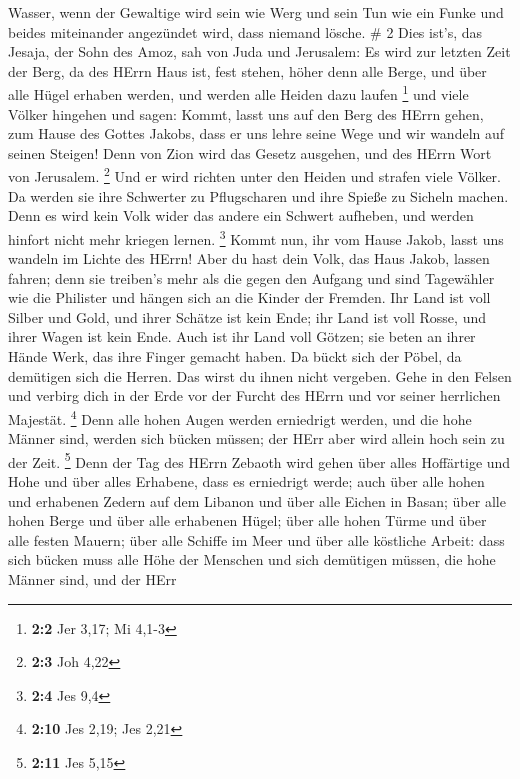 Wasser,  wenn der Gewaltige wird sein wie Werg und sein Tun
wie ein Funke und beides miteinander angezündet wird, dass niemand
lösche. \# 2  Dies ist's, das Jesaja, der Sohn des Amoz, sah
von Juda und Jerusalem:  Es wird zur letzten Zeit der Berg,
da des HErrn Haus ist, fest stehen, höher denn alle Berge, und über alle
Hügel erhaben werden, und werden alle Heiden dazu laufen \footnote{\textbf{2:2}
  Jer 3,17; Mi 4,1-3}  und viele Völker hingehen und sagen:
Kommt, lasst uns auf den Berg des HErrn gehen, zum Hause des Gottes
Jakobs, dass er uns lehre seine Wege und wir wandeln auf seinen Steigen!
Denn von Zion wird das Gesetz ausgehen, und des HErrn Wort von
Jerusalem. \footnote{\textbf{2:3} Joh 4,22}  Und er wird
richten unter den Heiden und strafen viele Völker. Da werden sie ihre
Schwerter zu Pflugscharen und ihre Spieße zu Sicheln machen. Denn es
wird kein Volk wider das andere ein Schwert aufheben, und werden hinfort
nicht mehr kriegen lernen. \footnote{\textbf{2:4} Jes 9,4} 
Kommt nun, ihr vom Hause Jakob, lasst uns wandeln im Lichte des HErrn!
 Aber du hast dein Volk, das Haus Jakob, lassen fahren; denn
sie treiben's mehr als die gegen den Aufgang und sind Tagewähler wie die
Philister und hängen sich an die Kinder der Fremden.  Ihr
Land ist voll Silber und Gold, und ihrer Schätze ist kein Ende; ihr Land
ist voll Rosse, und ihrer Wagen ist kein Ende.  Auch ist ihr
Land voll Götzen; sie beten an ihrer Hände Werk, das ihre Finger gemacht
haben.  Da bückt sich der Pöbel, da demütigen sich die
Herren. Das wirst du ihnen nicht vergeben.  Gehe in den
Felsen und verbirg dich in der Erde vor der Furcht des HErrn und vor
seiner herrlichen Majestät. \footnote{\textbf{2:10} Jes 2,19; Jes 2,21}
 Denn alle hohen Augen werden erniedrigt werden, und die
hohe Männer sind, werden sich bücken müssen; der HErr aber wird allein
hoch sein zu der Zeit. \footnote{\textbf{2:11} Jes 5,15} 
Denn der Tag des HErrn Zebaoth wird gehen über alles Hoffärtige und Hohe
und über alles Erhabene, dass es erniedrigt werde;  auch
über alle hohen und erhabenen Zedern auf dem Libanon und über alle
Eichen in Basan;  über alle hohen Berge und über alle
erhabenen Hügel;  über alle hohen Türme und über alle
festen Mauern;  über alle Schiffe im Meer und über alle
köstliche Arbeit:  dass sich bücken muss alle Höhe der
Menschen und sich demütigen müssen, die hohe Männer sind, und der HErr
